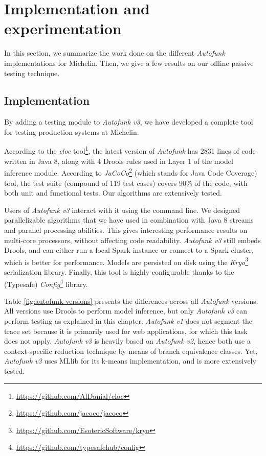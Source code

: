 \section{Implementation and experimentation}
\label{sec:testing:offline:impl-exp}

In this section, we summarize the work done on the different
\emph{Autofunk} implementations for Michelin. Then, we give a few
results on our offline passive testing technique.

\subsection{Implementation}

By adding a testing module to \emph{Autofunk v3}, we have
developed a complete tool for testing production systems at
Michelin.

According to the \emph{cloc}
tool\footnote{\url{https://github.com/AlDanial/cloc}}, the latest
version of \emph{Autofunk} has 2831 lines of code written in Java
8, along with 4 Drools rules used in Layer 1 of the model
inference module.  According to
\emph{JaCoCo}\footnote{\url{https://github.com/jacoco/jacoco}}
(which stands for Java Code Coverage) tool, the test suite
(compound of 119 test cases) covers 90\% of the code, with both
unit and functional tests. Our algorithms are extensively tested.

Users of \emph{Autofunk v3} interact with it using the command
line. We designed parallelizable algorithms that we have used in
combination with Java 8 streams and parallel processing
abilities. This gives interesting performance results on
multi-core processors, without affecting code readability.
\emph{Autofunk v3} still embeds Drools, and can either run a
local Spark instance or connect to a Spark cluster, which is
better for performance.  Models are persisted on disk using the
\emph{Kryo}\footnote{\url{https://github.com/EsotericSoftware/kryo}}
serialization library. Finally, this tool is highly configurable
thanks to the (Typesafe)
\emph{Config}\footnote{\url{https://github.com/typesafehub/config}}
library.

Table \ref{fig:autofunk-versions} presents the differences
across all \emph{Autofunk} versions. All versions use Drools to
perform model inference, but only \emph{Autofunk v3} can perform
testing as explained in this chapter. \emph{Autofunk v1} does not
segment the trace set because it is primarily used for web
applications, for which this task does not apply. \emph{Autofunk
v3} is heavily based on \emph{Autofunk v2}, hence both use a
context-specific reduction technique by means of branch
equivalence classes. Yet, \emph{Autofunk v3} uses MLlib for its
k-means implementation, and is more extensively tested.

